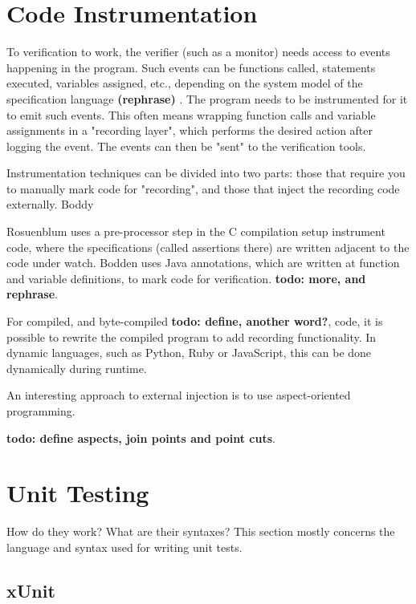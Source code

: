 \documentclass[a4paper,11pt]{kth-mag}
\newcommand{\todo}[1]{\textbf{todo: #1}}
\newcommand{\rephrase}{\textbf{(rephrase)} }
\begin{document}
\section{Code Instrumentation} \label{section-instrumentation}

To verification to work, the verifier (such as a monitor) needs access to
events happening in the program. Such events can be functions called,
statements executed, variables assigned, etc., depending on the system model of
the specification language \rephrase. The program needs to be instrumented for
it to emit such events. This often means wrapping function calls and variable
assignments in a "recording layer", which performs the desired action after
logging the event.  The events can then be "sent" to the verification tools.

Instrumentation techniques can be divided into two parts: those that require
you to manually mark code for "recording", and those that inject the recording
code externally. Boddy

Rosuenblum \cite{rosenblum95practicalassertions} uses a pre-processor step in
the C compilation setup instrument code, where the specifications (called
assertions there) are written adjacent to the code under watch. Bodden
\cite{bodden05efficientrv} uses Java annotations, which are written at function
and variable definitions, to mark code for verification. \todo{more, and
rephrase}.

For compiled, and byte-compiled \todo{define, another word?}, code, it is
possible to rewrite the compiled program to add recording functionality. In
dynamic languages, such as Python, Ruby or JavaScript, this can be done
dynamically during runtime.

An interesting approach to external injection is to use aspect-oriented
programming.

\todo{define aspects, join points and point cuts}.


\section{Unit Testing} \label{section-unit-testing}

How do they work? What are their syntaxes? This section mostly concerns the
language and syntax used for writing unit tests.

\subsection{xUnit}
\end{document}
